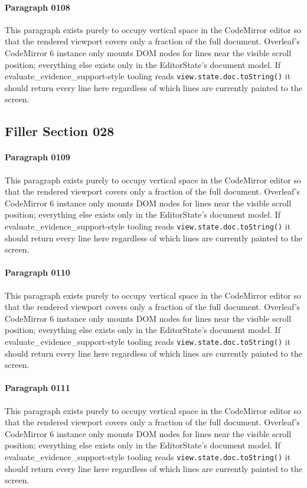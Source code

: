 \documentclass{article}
\begin{document}
\paragraph{Paragraph 0108}
This paragraph exists purely to occupy vertical space in the CodeMirror editor so that the rendered viewport covers only a fraction of the full document. Overleaf's CodeMirror 6 instance only mounts DOM nodes for lines near the visible scroll position; everything else exists only in the EditorState's document model. If evaluate\_evidence\_support-style tooling reads \texttt{view.state.doc.toString()} it should return every line here regardless of which lines are currently painted to the screen.

\subsection{Filler Section 028}
\paragraph{Paragraph 0109}
This paragraph exists purely to occupy vertical space in the CodeMirror editor so that the rendered viewport covers only a fraction of the full document. Overleaf's CodeMirror 6 instance only mounts DOM nodes for lines near the visible scroll position; everything else exists only in the EditorState's document model. If evaluate\_evidence\_support-style tooling reads \texttt{view.state.doc.toString()} it should return every line here regardless of which lines are currently painted to the screen.

\paragraph{Paragraph 0110}
This paragraph exists purely to occupy vertical space in the CodeMirror editor so that the rendered viewport covers only a fraction of the full document. Overleaf's CodeMirror 6 instance only mounts DOM nodes for lines near the visible scroll position; everything else exists only in the EditorState's document model. If evaluate\_evidence\_support-style tooling reads \texttt{view.state.doc.toString()} it should return every line here regardless of which lines are currently painted to the screen.

\paragraph{Paragraph 0111}
This paragraph exists purely to occupy vertical space in the CodeMirror editor so that the rendered viewport covers only a fraction of the full document. Overleaf's CodeMirror 6 instance only mounts DOM nodes for lines near the visible scroll position; everything else exists only in the EditorState's document model. If evaluate\_evidence\_support-style tooling reads \texttt{view.state.doc.toString()} it should return every line here regardless of which lines are currently painted to the screen.
\end{document}
